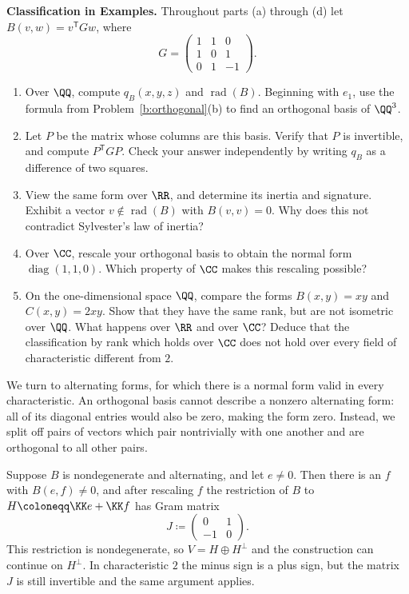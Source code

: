 \documentclass[12pt,reqno]{amsart}
\DeclareMathOperator{\rad}{rad}
\DeclareMathOperator{\diag}{diag}
\begin{document}
\hrulefill

\begin{problems}
\item\label{b:examples} \textbf{Classification in Examples.} Throughout parts (a) through (d) let $B(v,w)=v^{\mathsf T}Gw$, where
\[
G=\begin{pmatrix}1&1&0\\1&0&1\\0&1&-1\end{pmatrix}.
\]
\begin{enumerate}
\item Over $\QQ$, compute $q_B(x,y,z)$ and $\rad(B)$. Beginning with $e_1$, use the formula from Problem~\ref{b:orthogonal}(b) to find an orthogonal basis of $\QQ^3$.
\item Let $P$ be the matrix whose columns are this basis. Verify that $P$ is invertible, and compute $P^{\mathsf T}GP$. Check your answer independently by writing $q_B$ as a difference of two squares.
\item View the same form over $\RR$, and determine its inertia and signature. Exhibit a vector $v\notin\rad(B)$ with $B(v,v)=0$. Why does this not contradict Sylvester's law of inertia?
\item Over $\CC$, rescale your orthogonal basis to obtain the normal form $\diag(1,1,0)$. Which property of $\CC$ makes this rescaling possible?
\item On the one-dimensional space $\QQ$, compare the forms $B(x,y)=xy$ and $C(x,y)=2xy$. Show that they have the same rank, but are not isometric over $\QQ$. What happens over $\RR$ and over $\CC$? Deduce that the classification by rank which holds over $\CC$ does not hold over every field of characteristic different from $2$.
\end{enumerate}
\end{problems}

\hrulefill

We turn to alternating forms, for which there is a normal form valid in every characteristic. An orthogonal basis cannot describe a nonzero alternating form: all of its diagonal entries would also be zero, making the form zero. Instead, we split off pairs of vectors which pair nontrivially with one another and are orthogonal to all other pairs.

Suppose $B$ is nondegenerate and alternating, and let $e\ne0$. Then there is an $f$ with $B(e,f)\ne0$, and after rescaling $f$ the restriction of $B$ to $H\coloneqq\KK e+\KK f$ has Gram matrix
\[
J\coloneqq\begin{pmatrix}0&1\\-1&0\end{pmatrix}.
\]
This restriction is nondegenerate, so $V=H\oplus H^{\perp}$ and the construction can continue on $H^{\perp}$. In characteristic $2$ the minus sign is a plus sign, but the matrix $J$ is still invertible and the same argument applies.
\end{document}
